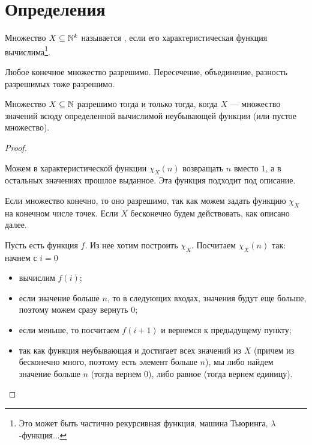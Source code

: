\section{Определения}
\begin{defn}
	Множество $ X \subseteq \mathbb{N}^{k}$ называется , если его характеристическая функция вычислима\footnote{Это может быть частично рекурсивная функция, машина Тьюринга, $ \lambda$-функция...}.
\end{defn}
\begin{note}
    Любое конечное множество разрешимо. Пересечение, объединение, разность разрешимых тоже разрешимо.
\end{note}
\begin{thm}
	Множество $ X \subseteq \mathbb{N}$ разрешимо тогда и только тогда, когда $ X$ --- множество значений всюду определенной вычислимой неубывающей функции (или пустое множество).
\end{thm}
\begin{proof}
	~\begin{description}
		\item {} Можем в характеристической функции $ \chi_{X}(n)$ возвращать $ n$ вместо $ 1$, а в остальных значениях прошлое выданное. Эта функция подходит под описание.
        \item {} 
			Если множество конечно, то оно разрешимо, так как можем задать функцию $ \chi_X$ на конечном числе точек. 
			Если $ X$ бесконечно будем действовать, как описано далее.

			Пусть есть функция $ f$. Из нее хотим построить $ \chi_{X}$. Посчитаем $ \chi_{X}(n)$ так: 
			начнем с $ i = 0$
			\begin{itemize}
				\item вычислим $ f(i)$;
				\item если значение больше $ n$, то в следующих входах, значения будут еще больше, поэтому можем сразу вернуть  $ 0$;
				\item если меньше, то посчитаем $ f(i+1)$ и вернемся к предыдущему пункту;
				\item так как функция неубывающая и достигает всех значений из $ X$ (причем из бесконечно много, поэтому есть элемент больше $ n$), мы либо найдем значение больше $ n$ (тогда вернем $ 0$), либо равное (тогда вернем единицу).
			\end{itemize}
    \end{description} 
\end{proof}



